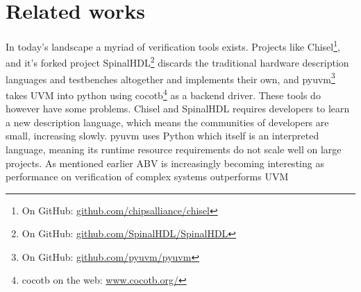 \section{Related works}\label{sec:03}
In today's landscape a myriad of verification tools exists. Projects like Chisel\footnote{On GitHub: \href{https://github.com/chipsalliance/chisel}{github.com/chipsalliance/chisel}}, and it's forked project SpinalHDL\footnote{On GitHub: \href{https://github.com/SpinalHDL/SpinalHDL}{github.com/SpinalHDL/SpinalHDL}} discards the traditional hardware description languages and testbenches altogether and implements their own, and pyuvm\footnote{On GitHub: \href{https://github.com/pyuvm/pyuvm}{github.com/pyuvm/pyuvm}} takes UVM into python using cocotb\footnote{cocotb on the web: \href{https://www.cocotb.org/}{www.cocotb.org/}} as a backend driver. These tools do however have some problems. Chisel and SpinalHDL requires developers to learn a new description language, which means the communities of developers are small, increasing slowly. pyuvm uses Python which itself is an interpreted language, meaning its runtime resource requirements do not scale well on large projects.
As mentioned earlier ABV is increasingly becoming interesting as performance on verification of complex systems outperforms UVM\cite{reddy_formal_2024}